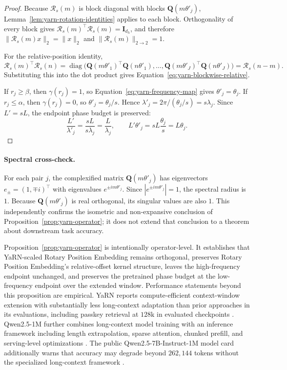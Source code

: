 \documentclass[11pt]{article}
\begin{document}
\begin{proof}
Because \(\mathcal R_s(m)\) is block diagonal with blocks \(\mathbf Q(m\theta'_j)\), Lemma~\ref{lem:yarn-rotation-identities} applies to each block. Orthogonality of every block gives \(\mathcal R_s(m)^\top \mathcal R_s(m)=\mathbf I_{d_h}\), and therefore \(\|\mathcal R_s(m)x\|_2=\|x\|_2\) and \(\|\mathcal R_s(m)\|_{2\to2}=1\).

For the relative-position identity,
\[
\mathcal R_s(m)^\top\mathcal R_s(n)
=
\operatorname{diag}\!\bigl(
\mathbf Q(m\theta'_1)^\top\mathbf Q(n\theta'_1),
\dots,
\mathbf Q(m\theta'_J)^\top\mathbf Q(n\theta'_J)
\bigr)
=
\mathcal R_s(n-m).
\]
Substituting this into the dot product gives Equation~\eqref{eq:yarn-blockwise-relative}.

If \(r_j\ge\beta\), then \(\gamma(r_j)=1\), so Equation~\eqref{eq:yarn-frequency-map} gives \(\theta'_j=\theta_j\). If \(r_j\le\alpha\), then \(\gamma(r_j)=0\), so \(\theta'_j=\theta_j/s\). Hence \(\lambda'_j=2\pi/(\theta_j/s)=s\lambda_j\). Since \(L'=sL\), the endpoint phase budget is preserved:
\[
\frac{L'}{\lambda'_j}=\frac{sL}{s\lambda_j}=\frac{L}{\lambda_j},
\qquad
L'\theta'_j=sL\frac{\theta_j}{s}=L\theta_j.
\]
\end{proof}

\paragraph{Spectral cross-check.}
For each pair \(j\), the complexified matrix \(\mathbf Q(m\theta'_j)\) has eigenvectors \(e_\pm=(1,\mp i)^\top\) with eigenvalues \(e^{\pm i m\theta'_j}\). Since \(|e^{\pm i m\theta'_j}|=1\), the spectral radius is \(1\). Because \(\mathbf Q(m\theta'_j)\) is real orthogonal, its singular values are also \(1\). This independently confirms the isometric and non-expansive conclusion of Proposition~\ref{prop:yarn-operator}; it does not extend that conclusion to a theorem about downstream task accuracy.

Proposition~\ref{prop:yarn-operator} is intentionally operator-level. It establishes that YaRN-scaled Rotary Position Embedding remains orthogonal, preserves Rotary Position Embedding's relative-offset kernel structure, leaves the high-frequency endpoint unchanged, and preserves the pretrained phase budget at the low-frequency endpoint over the extended window. Performance statements beyond this proposition are empirical. YaRN reports compute-efficient context-window extension with substantially less long-context adaptation than prior approaches in its evaluations, including passkey retrieval at \(128\text{k}\) in evaluated checkpoints \citep{peng2023yarn}. Qwen2.5-1M further combines long-context model training with an inference framework including length extrapolation, sparse attention, chunked prefill, and serving-level optimizations \citep{yang2025qwen25oneM}. The public Qwen2.5-7B-Instruct-1M model card additionally warns that accuracy may degrade beyond \(262{,}144\) tokens without the specialized long-context framework \citep{qwen2025qwen25oneMcard}.
\end{document}
